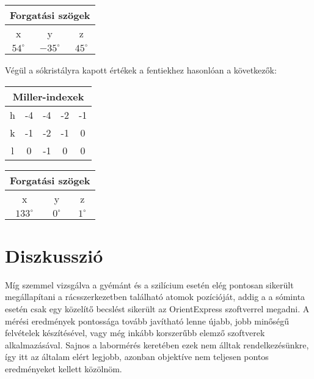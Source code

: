 \begin{multicols}{2}
\begin{center}
\begin{tabular}{|c|c|c|}
\hline
\multicolumn{3}{|c|}{Forgatási szögek} \\ \hline \hline
x            & y             & z            \\ \hline
$54^{\circ}$ & $-35^{\circ}$ & $45^{\circ}$ \\
\hline
\end{tabular}
 \label{table:4}
\end{center}
Végül a sókristályra kapott értékek a fentiekhez hasonlóan a következők:

\begin{center}
\begin{tabular}{|c|c|c|c|c|}
\hline
\multicolumn{5}{|c|}{Miller-indexek} \\ \hline \hline
h & -4 & -4 & -2 & -1 \\
k & -1 & -2 & -1 &  0 \\
l &  0 & -1 &  0 &  0 \\
\hline
\end{tabular}
 \label{table:5}
\end{center}
\begin{center}
\begin{tabular}{|c|c|c|}
\hline
\multicolumn{3}{|c|}{Forgatási szögek} \\ \hline \hline
x            & y             & z            \\ \hline
$133^{\circ}$ & $0^{\circ}$ & $1^{\circ}$   \\
\hline
\end{tabular}
 \label{table:6}
\end{center}

\section{Diszkusszió}
Míg szemmel vizsgálva a gyémánt és a szilícium esetén elég pontosan sikerült megállapítani a rácsszerkezetben található atomok pozícióját, addig a a sóminta esetén csak egy közelítő becslést sikerült az OrientExpress szoftverrel megadni. A mérési eredmények pontossága tovább javítható lenne újabb, jobb minőségű felvételek készítésével, vagy még inkább korszerűbb elemző szoftverek alkalmazásával. Sajnos a labormérés keretében ezek nem álltak rendelkezésünkre, így itt az általam elért legjobb, azonban objektíve nem teljesen pontos eredményeket kellett közölnöm.

\end{multicols}